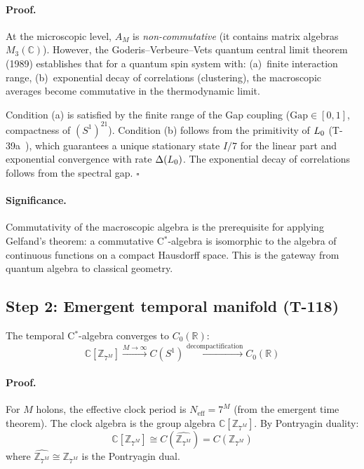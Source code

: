 \paragraph{Proof.}
At the microscopic level, $A_M$ is \emph{non-commutative} (it contains matrix algebras
$M_3(\mathbb{C})$). However, the Goderis--Verbeure--Vets quantum central limit theorem~\cite{goderis1989}
(1989) establishes that for a quantum spin system with: (a)~finite interaction range,
(b)~exponential decay of correlations (clustering), the macroscopic averages become
commutative in the thermodynamic limit.

Condition (a) is satisfied by the finite range of the Gap coupling
($\mathrm{Gap} \in [0,1]$, compactness of $(S^1)^{21}$). Condition (b) follows from the
primitivity of $L_0$ (T-39a~), which guarantees a unique stationary state
$I/7$ for the linear part and exponential convergence with rate $\Delta(L_0)$. The
exponential decay of correlations follows from the spectral gap. $\square$

\paragraph{Significance.}
Commutativity of the macroscopic algebra is the prerequisite for applying Gelfand's theorem:
a commutative C$^*$-algebra is isomorphic to the algebra of continuous functions on a
compact Hausdorff space. This is the gateway from quantum algebra to classical geometry.

\subsection{Step 2: Emergent temporal manifold (T-118)}

\begin{theorembox}
The temporal C$^*$-algebra converges to $C_0(\mathbb{R})$:
\begin{equation}
  \mathbb{C}[\mathbb{Z}_{7^M}]
  \xrightarrow{M \to \infty}
  C(S^1)
  \xrightarrow{\text{decompactification}}
  C_0(\mathbb{R})
  \label{eq:temporal-algebra}
\end{equation}
\end{theorembox}

\paragraph{Proof.}
For $M$ holons, the effective clock period is $N_{\mathrm{eff}} = 7^M$ (from the emergent
time theorem). The clock algebra is the group algebra $\mathbb{C}[\mathbb{Z}_{7^M}]$.
By Pontryagin duality:
\begin{equation}
  \mathbb{C}[\mathbb{Z}_{7^M}] \cong C(\widehat{\mathbb{Z}_{7^M}})
  = C(\mathbb{Z}_{7^M})
\end{equation}
where $\widehat{\mathbb{Z}_{7^M}} \cong \mathbb{Z}_{7^M}$ is the Pontryagin dual.

